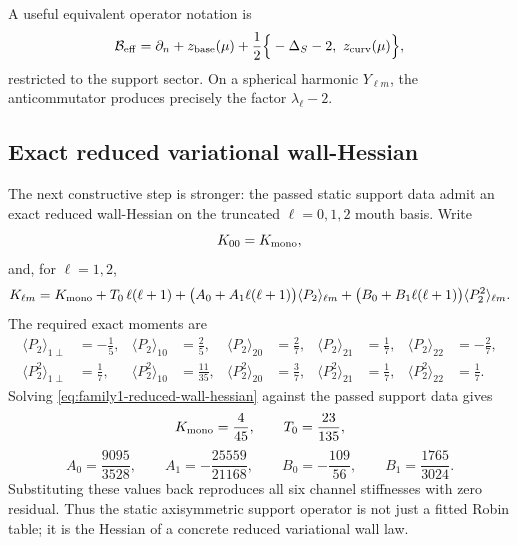 \documentclass[11pt]{article}
\begin{document}
A useful equivalent operator notation is
\begin{equation}
\mathcal B_{\rm eff}
=
\partial_n
+
z_{\rm base}(\mu)
+\frac12\Big\{-\Delta_S-2,\ z_{\rm curv}(\mu)\Big\},
\label{eq:family1-generalized-robin}
\end{equation}
restricted to the support sector.  On a spherical harmonic \(Y_{\ell m}\), the
anticommutator produces precisely the factor \(\lambda_\ell-2\).

\subsection{Exact reduced variational wall-Hessian}
\label{app:family1-hessian}

The next constructive step is stronger: the passed static support data admit an exact
reduced wall-Hessian on the truncated \(\ell=0,1,2\) mouth basis.  Write
\begin{equation}
K_{00}=K_{\rm mono},
\label{eq:family1-Kmono-def}
\end{equation}
and, for \(\ell=1,2\),
\begin{equation}
K_{\ell m}
=
K_{\rm mono}
+
T_0\,\ell(\ell+1)
+
\bigl(A_0+A_1\ell(\ell+1)\bigr)\langle P_2\rangle_{\ell m}
+
\bigl(B_0+B_1\ell(\ell+1)\bigr)\langle P_2^2\rangle_{\ell m}.
\label{eq:family1-reduced-wall-hessian}
\end{equation}
The required exact moments are
\begin{align}
\langle P_2\rangle_{1\perp}&=-\frac15,
&
\langle P_2\rangle_{10}&=\frac25,
&
\langle P_2\rangle_{20}&=\frac27,
&
\langle P_2\rangle_{21}&=\frac17,
&
\langle P_2\rangle_{22}&=-\frac27,
\label{eq:family1-P2-moments}
\\
\langle P_2^2\rangle_{1\perp}&=\frac17,
&
\langle P_2^2\rangle_{10}&=\frac{11}{35},
&
\langle P_2^2\rangle_{20}&=\frac37,
&
\langle P_2^2\rangle_{21}&=\frac17,
&
\langle P_2^2\rangle_{22}&=\frac17.
\label{eq:family1-P2sq-moments}
\end{align}
Solving \cref{eq:family1-reduced-wall-hessian} against the passed support data gives
\begin{equation}
K_{\rm mono}=\frac{4}{45},
\qquad
T_0=\frac{23}{135},
\label{eq:family1-T0}
\end{equation}
\begin{equation}
A_0=\frac{9095}{3528},
\qquad
A_1=-\frac{25559}{21168},
\qquad
B_0=-\frac{109}{56},
\qquad
B_1=\frac{1765}{3024}.
\label{eq:family1-A0A1B0B1}
\end{equation}
Substituting these values back reproduces all six channel stiffnesses with zero residual.
Thus the static axisymmetric support operator is not just a fitted Robin table; it is the
Hessian of a concrete reduced variational wall law.
\end{document}
